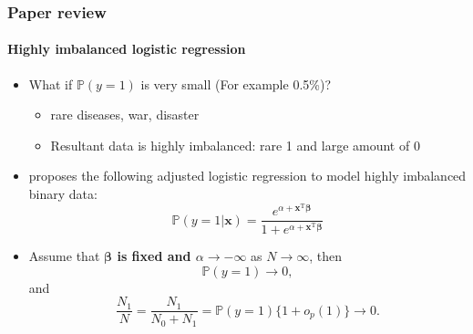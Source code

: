 \documentclass{beamer}
\newcommand{\red}{\color{red}}
\newcommand{\bbeta}{\bm{\beta}}
\newcommand{\x}{\bm{x}}
\newcommand{\tp}{^{\mathrm{T}}}
\newcommand{\pr}{\mathbb{P}}
\newcommand{\rhl}[1]{{\red \textbf{#1}}}
\begin{document}
    \begin{frame}
        \frametitle{Paper review}
        \framesubtitle{Highly imbalanced logistic regression}
        \begin{itemize}
            \item What if $\pr(y=1)$ is very small (For example 0.5\%)?
            \begin{itemize}
                \item rare diseases, war, disaster
                \item Resultant data is highly imbalanced: rare 1 and large amount of 0
            \end{itemize}
        \end{itemize}
        \begin{itemize}
            \item \cite{wang2020logistic} proposes the following adjusted logistic regression to model highly imbalanced binary data:
            \begin{equation*}
                \pr(y=1|\x)=\frac{e^{\alpha+\x\tp\bbeta}}{1+e^{\alpha+\x\tp\bbeta}}
            \end{equation*}
            \item Assume that \rhl{$\bbeta$ is fixed and $\alpha\to-\infty$} as $N\to\infty$, then
            \begin{equation*}
                \pr(y=1)\to 0,
            \end{equation*}
            and
            \begin{equation*}
                \frac{N_1}{N}=\frac{N_1}{N_0+N_1}=\pr(y=1)\{1+o_p(1)\}\to0.
            \end{equation*}
        \end{itemize}    
    \end{frame}
\end{document}
